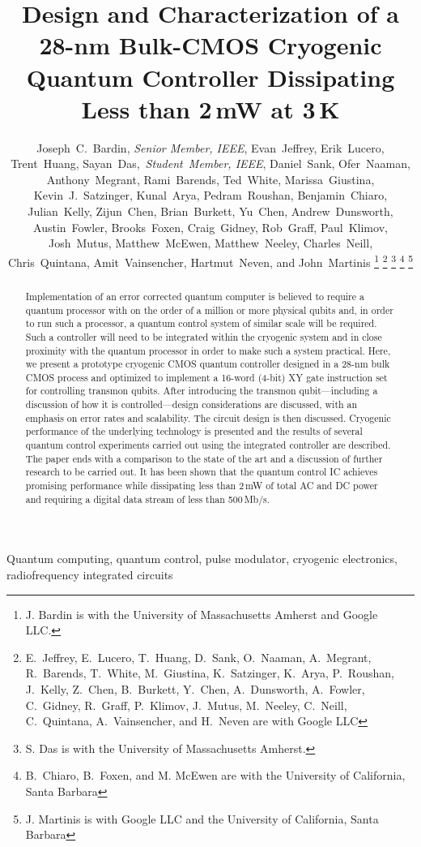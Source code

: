 \documentclass[journal]{IEEEtran}
\newcommand{\CR}[1]{{\color{black}#1}}
\begin{document}
\title{Design and Characterization of a 28-nm Bulk-CMOS Cryogenic Quantum Controller Dissipating Less than 2\,mW at 3\,K}
\author{Joseph~C.~Bardin, \emph{Senior Member, IEEE}, Evan~Jeffrey, Erik~Lucero, Trent~Huang, Sayan~Das,~\emph{Student~Member, IEEE}, Daniel~Sank,  Ofer~Naaman, Anthony~Megrant, Rami~Barends, Ted~White, Marissa~Giustina,  Kevin~J.~Satzinger, Kunal~Arya,  Pedram~Roushan, Benjamin~Chiaro, Julian~Kelly, Zijun~Chen, Brian~Burkett, Yu~Chen, Andrew~Dunsworth, Austin~Fowler, Brooks~Foxen, Craig~Gidney, Rob~Graff, Paul~Klimov, Josh~Mutus, Matthew~McEwen,  Matthew~Neeley, Charles~Neill, Chris~Quintana, Amit~Vainsencher, Hartmut~Neven, and John~Martinis
\thanks{J. Bardin is with the University of Massachusetts Amherst and Google LLC.}
\thanks{E.~Jeffrey, E.~Lucero, T.~Huang, D.~Sank, O.~Naaman, A.~Megrant, R.~Barends, T.~White, M.~Giustina, K.~Satzinger, K.~Arya, P.~Roushan, J.~Kelly, Z.~Chen, B.~Burkett, Y.~Chen, A.~Dunsworth, A.~Fowler, C.~Gidney, R.~Graff, P.~Klimov, J.~Mutus,  M.~Neeley, C.~Neill, C.~Quintana, A.~Vainsencher, and H.~Neven are with Google LLC}
\thanks{S. Das is with the University of Massachusetts Amherst.}
\thanks{B.~Chiaro, B.~Foxen, and M. McEwen are with the University of California, Santa Barbara}
\thanks{J. Martinis is with Google LLC and the University of California, Santa Barbara}}
\maketitle
\begin{abstract}
Implementation of an error corrected quantum computer is believed to require a quantum processor with on the order of a million or more physical qubits and, in order to run such a processor, a quantum control system of similar scale will be required. Such a controller will need to be integrated within the cryogenic system and in close proximity with the quantum processor in order to make such a system practical. Here, we present a prototype cryogenic CMOS quantum controller designed in a 28-nm bulk CMOS process and optimized to implement a \CR{16-word (4-bit)} XY gate instruction set for \CR{controlling} transmon qubits. After introducing the transmon qubit\CR{---}including a discussion of how it is controlled\CR{---}design considerations are discussed, with an emphasis on error rates and scalability. The circuit design is then discussed. Cryogenic performance of the underlying technology is presented and the results of several quantum control experiments carried out using the integrated controller are described. The paper ends with a comparison to the state of the art and a discussion of further research to be carried out. It has been shown that the quantum control IC achieves \CR{promising performance} %
while dissipating less than 2\,mW of total AC and DC power and requiring a digital data stream of less than 500\,Mb/s.
\end{abstract}
\begin{IEEEkeywords}
Quantum computing, quantum control, pulse modulator, cryogenic electronics, radiofrequency integrated circuits 
\end{IEEEkeywords}
\end{document}
